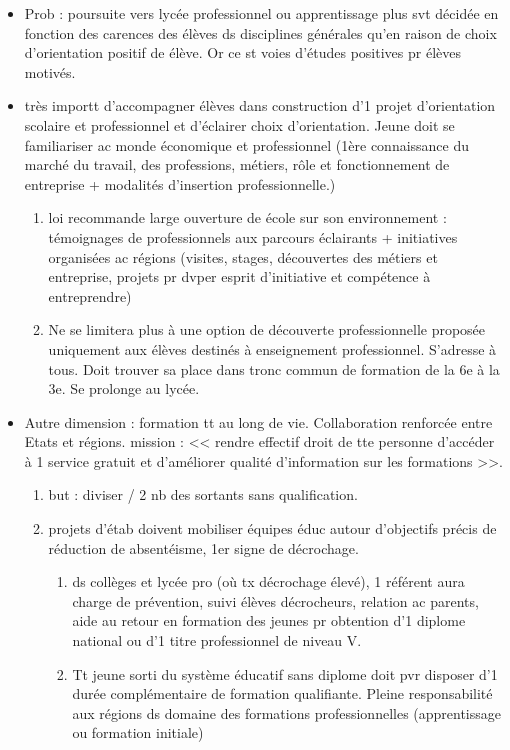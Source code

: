 \documentclass[12pt]{report}
\begin{document}
\begin{itemize}
\item Prob : poursuite vers lycée professionnel ou apprentissage plus svt décidée en fonction des carences des élèves ds disciplines générales qu'en raison de choix d'orientation positif de élève. Or ce st voies d'études positives pr élèves motivés. \\

\item très importt d'accompagner élèves dans construction d'1 projet d'orientation scolaire et professionnel et d'éclairer choix d'orientation.  Jeune doit se familiariser ac monde économique et professionnel (1ère connaissance du marché du travail, des professions, métiers, rôle et fonctionnement de entreprise + modalités d'insertion professionnelle.)
\begin{enumerate}
\item loi recommande large ouverture de école sur son environnement : témoignages de professionnels aux parcours éclairants + initiatives organisées ac régions (visites, stages, découvertes des métiers et entreprise, projets pr dvper esprit d'initiative et compétence à entreprendre) \\
\item Ne se limitera plus à une option de découverte professionnelle proposée uniquement aux élèves destinés à enseignement professionnel. S'adresse à tous. Doit trouver sa place dans tronc commun de formation de la 6e à la 3e. Se prolonge au lycée. \\
\end{enumerate}

\item Autre dimension : formation tt au long de vie. Collaboration renforcée entre Etats et régions. mission : << rendre effectif droit de tte personne d'accéder à 1 service gratuit et d'améliorer qualité d'information sur les formations >>. \\
\begin{enumerate}
\item but :  diviser / 2 nb des sortants sans qualification. \\
\item projets d'étab doivent mobiliser équipes éduc autour d'objectifs précis de réduction de absentéisme, 1er signe de décrochage.
\begin{enumerate}
\item ds  collèges et lycée pro (où tx décrochage élevé), 1 référent aura charge de prévention, suivi élèves décrocheurs, relation ac parents, aide au retour en formation des jeunes pr obtention d'1 diplome national ou d'1 titre professionnel de niveau V. \\
\item Tt jeune sorti du système éducatif sans diplome doit pvr disposer d'1 durée complémentaire de formation qualifiante. Pleine responsabilité aux régions ds domaine des formations professionnelles (apprentissage ou formation initiale)
\end{enumerate}
\end{enumerate}


\end{itemize}
\end{document}
